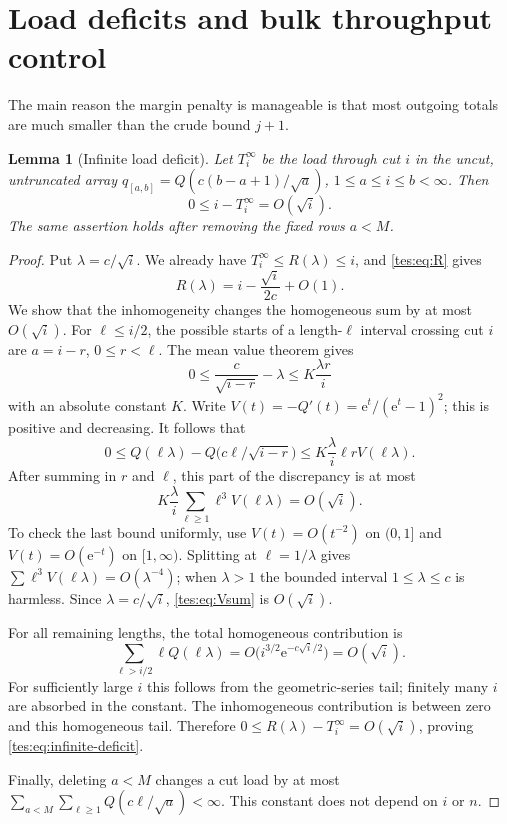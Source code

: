 \documentclass[11pt,a4paper]{article}
\newtheorem{lemma}[theorem]{Lemma}
\theoremstyle{remark}\newtheorem{remark}[theorem]{Remark}
\newcommand{\ee}{\mathrm e}\newcommand{\dd}{\,\mathrm d}
\numberwithin{equation}{section}
\begin{document}
\section{Load deficits and bulk throughput control}\label{tes:sec:throughput}
The main reason the margin penalty is manageable is that most outgoing totals are much smaller than the crude bound $j+1$.

\begin{lemma}[Infinite load deficit]\label{tes:lem:deficit}
Let $T_i^\infty$ be the load through cut $i$ in the uncut, untruncated array
$q_{[a,b]}=Q(c(b-a+1)/\sqrt a)$, $1\le a\le i\le b<\infty$.
Then
\begin{equation}\label{tes:eq:infinite-deficit}
0\le i-T_i^\infty=O(\sqrt i).
\end{equation}
The same assertion holds after removing the fixed rows $a<M$.
\end{lemma}
\begin{proof}
Put $\lambda=c/\sqrt i$. We already have $T_i^\infty\le R(\lambda)\le i$, and \eqref{tes:eq:R} gives
\[
R(\lambda)=i-\frac{\sqrt i}{2c}+O(1).
\]
We show that the inhomogeneity changes the homogeneous sum by at most $O(\sqrt i)$.
For $\ell\le i/2$, the possible starts of a length-$\ell$ interval crossing cut $i$ are $a=i-r$, $0\le r<\ell$. The mean value theorem gives
\[
0\le\frac c{\sqrt{i-r}}-\lambda\le K\frac{\lambda r}{i}
\]
with an absolute constant $K$. Write
$V(t)=-Q'(t)=\ee^t/(\ee^t-1)^2$; this is positive and decreasing. It follows that
\[
0\le Q(\ell\lambda)-Q\bigl(c\ell/\sqrt{i-r}\bigr)
\le K\frac\lambda i\ell rV(\ell\lambda).
\]
After summing in $r$ and $\ell$, this part of the discrepancy is at most
\begin{equation}\label{tes:eq:Vsum}
K\frac\lambda i\sum_{\ell\ge1}\ell^3V(\ell\lambda)=O(\sqrt i).
\end{equation}
To check the last bound uniformly, use $V(t)=O(t^{-2})$ on $(0,1]$ and $V(t)=O(\ee^{-t})$ on $[1,\infty)$. Splitting at $\ell=1/\lambda$ gives
$\sum\ell^3V(\ell\lambda)=O(\lambda^{-4})$; when $\lambda>1$ the bounded interval $1\le\lambda\le c$ is harmless. Since $\lambda=c/\sqrt i$, \eqref{tes:eq:Vsum} is $O(\sqrt i)$.

For all remaining lengths, the total homogeneous contribution is
\[
\sum_{\ell>i/2}\ell Q(\ell\lambda)
=O\bigl(i^{3/2}\ee^{-c\sqrt i/2}\bigr)=O(\sqrt i).
\]
For sufficiently large $i$ this follows from the geometric-series tail; finitely many $i$ are absorbed in the constant. The inhomogeneous contribution is between zero and this homogeneous tail. Therefore
$0\le R(\lambda)-T_i^\infty=O(\sqrt i)$, proving \eqref{tes:eq:infinite-deficit}.

Finally, deleting $a<M$ changes a cut load by at most
$\sum_{a<M}\sum_{\ell\ge1}Q(c\ell/\sqrt a)<\infty$.
This constant does not depend on $i$ or $n$.
\end{proof}
\end{document}
